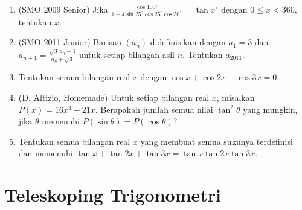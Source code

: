 \documentclass[12pt]{scrartcl}
\begin{document}
\begin{enumerate}

	\item (SMO 2009 Senior)
	Jika $\frac{\cos 100^{\circ}}
	{1-4\sin 25^{\circ}\cos 25^{\circ}\cos 50^{\circ}} = \tan x^{\circ}$
	dengan $0 \le x < 360$, tentukan $x$.

	\item (SMO 2011 Junior)
	Barisan $(a_n)$ didefinisikan dengan $a_1 = 3$ dan
	$a_{n+1} = \frac{\sqrt{3}\,a_n-1}{a_n+\sqrt{3}}$ untuk setiap bilangan asli $n$.
	Tentukan $a_{2011}$.

	\item
	Tentukan semua bilangan real $x$ dengan $\cos x + \cos 2x + \cos 3x = 0$.

	\item (D. Altizio, Homemade)
	Untuk setiap bilangan real $x$, misalkan $P(x) = 16x^3-21x$.
	Berapakah jumlah semua nilai $\tan^2\theta$ yang mungkin, jika $\theta$
	memenuhi $P(\sin\theta) = P(\cos\theta)$?

	\item
	Tentukan semua bilangan real $x$ yang membuat semua sukunya terdefinisi dan
	memenuhi $\tan x + \tan 2x + \tan 3x = \tan x\tan 2x\tan 3x$.

\end{enumerate}

\section{Teleskoping Trigonometri}
\end{document}
